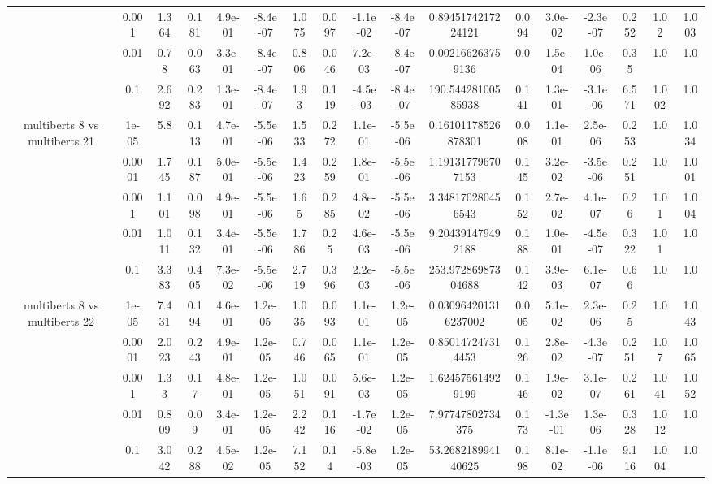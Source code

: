 \begin{tabular}{|c|c|c|c|c|c|c|c|c|c|c|c|c|c|c|c|c|}
 & 0.001 & 1.364 & 0.181 & 4.9e-01 & -8.4e-07 & 1.075 & 0.097 & -1.1e-02 & -8.4e-07 & 0.8945174217224121 & 0.094 & 3.0e-02 & -2.3e-07 & 0.252 & 1.02 & 1.003 \\
 & 0.01 & 0.78 & 0.063 & 3.3e-01 & -8.4e-07 & 0.806 & 0.046 & 7.2e-03 & -8.4e-07 & 0.002166263759136 & 0.0 & 1.5e-04 & 1.0e-06 & 0.35 & 1.0 & 1.0 \\
 & 0.1 & 2.692 & 0.283 & 1.3e-01 & -8.4e-07 & 1.93 & 0.119 & -4.5e-03 & -8.4e-07 & 190.54428100585938 & 0.141 & 1.3e-01 & -3.1e-06 & 6.571 & 1.002 & 1.0 \\
\hline
\multirow{5}{*}{multiberts 8 vs multiberts 21} & 1e-05 & 5.8 & 0.113 & 4.7e-01 & -5.5e-06 & 1.533 & 0.272 & 1.1e-01 & -5.5e-06 & 0.16101178526878301 & 0.008 & 1.1e-01 & 2.5e-06 & 0.253 & 1.0 & 1.034 \\
 & 0.0001 & 1.745 & 0.187 & 5.0e-01 & -5.5e-06 & 1.423 & 0.259 & 1.8e-01 & -5.5e-06 & 1.191317796707153 & 0.145 & 3.2e-02 & -3.5e-06 & 0.251 & 1.0 & 1.001 \\
 & 0.001 & 1.101 & 0.098 & 4.9e-01 & -5.5e-06 & 1.65 & 0.285 & 4.8e-02 & -5.5e-06 & 3.348170280456543 & 0.152 & 2.7e-02 & 4.1e-07 & 0.26 & 1.01 & 1.004 \\
 & 0.01 & 1.011 & 0.132 & 3.4e-01 & -5.5e-06 & 1.786 & 0.25 & 4.6e-03 & -5.5e-06 & 9.204391479492188 & 0.188 & 1.0e-01 & -4.5e-07 & 0.322 & 1.01 & 1.0 \\
 & 0.1 & 3.383 & 0.405 & 7.3e-02 & -5.5e-06 & 2.719 & 0.396 & 2.2e-03 & -5.5e-06 & 253.97286987304688 & 0.142 & 3.9e-03 & 6.1e-07 & 0.66 & 1.0 & 1.0 \\
\hline
\multirow{5}{*}{multiberts 8 vs multiberts 22} & 1e-05 & 7.431 & 0.194 & 4.6e-01 & 1.2e-05 & 1.035 & 0.093 & 1.1e-01 & 1.2e-05 & 0.030964201316237002 & 0.005 & 5.1e-02 & 2.3e-06 & 0.25 & 1.0 & 1.043 \\
 & 0.0001 & 2.023 & 0.243 & 4.9e-01 & 1.2e-05 & 0.746 & 0.065 & 1.1e-01 & 1.2e-05 & 0.850147247314453 & 0.126 & 2.8e-02 & -4.3e-07 & 0.251 & 1.07 & 1.065 \\
 & 0.001 & 1.33 & 0.17 & 4.8e-01 & 1.2e-05 & 1.051 & 0.091 & 5.6e-03 & 1.2e-05 & 1.624575614929199 & 0.146 & 1.9e-02 & 3.1e-07 & 0.261 & 1.041 & 1.052 \\
 & 0.01 & 0.809 & 0.09 & 3.4e-01 & 1.2e-05 & 2.242 & 0.116 & -1.7e-02 & 1.2e-05 & 7.97747802734375 & 0.173 & -1.3e-01 & 1.3e-06 & 0.328 & 1.012 & 1.0 \\
 & 0.1 & 3.042 & 0.288 & 4.5e-02 & 1.2e-05 & 7.152 & 0.14 & -5.8e-03 & 1.2e-05 & 53.268218994140625 & 0.198 & 8.1e-02 & -1.1e-06 & 9.116 & 1.004 & 1.0 \\

\end{tabular}
